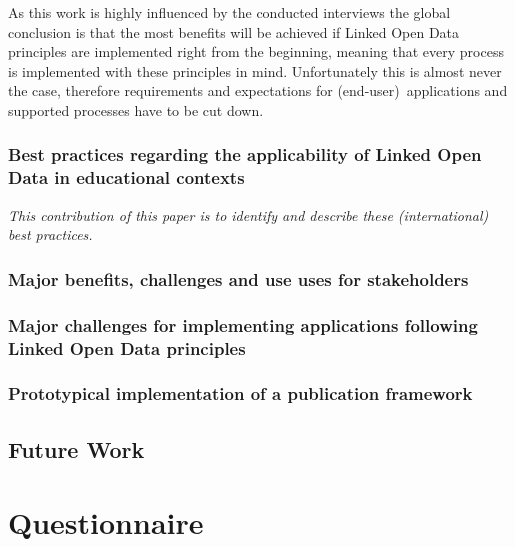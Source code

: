 \documentclass{article}
\begin{document}
As this work is highly influenced by the conducted interviews the global conclusion is that the most benefits will be achieved if Linked Open Data principles are implemented right from the beginning, meaning that every process is implemented with these principles in mind. Unfortunately this is almost never the case, therefore requirements and expectations for (end-user)~applications and supported processes have to be cut down. 

\subsubsection{Best practices regarding the applicability of Linked Open Data in educational contexts}


\textit{This contribution of this paper is to identify and describe these (international) best practices.}

\subsubsection{Major benefits, challenges and use uses for stakeholders}

\subsubsection{Major challenges for implementing applications following Linked Open Data principles}

\subsubsection{Prototypical implementation of a publication framework}


\subsection{Future Work}
\label{sec:future_work}

\newpage
{}



\newpage
\appendix

\section{Questionnaire}

\end{document}

